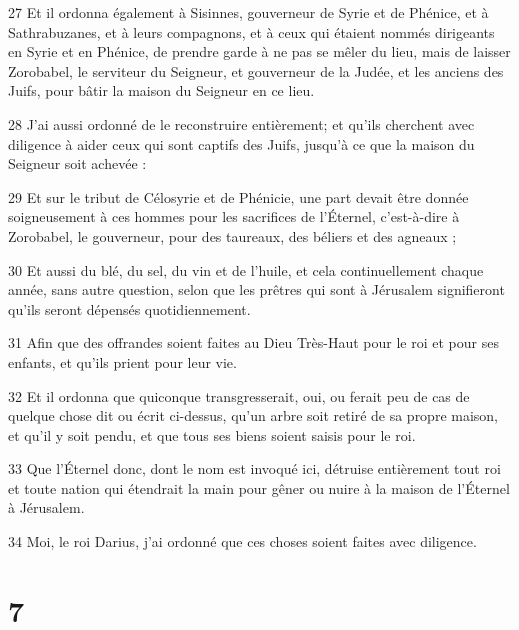 \par 27 Et il ordonna également à Sisinnes, gouverneur de Syrie et de Phénice, et à Sathrabuzanes, et à leurs compagnons, et à ceux qui étaient nommés dirigeants en Syrie et en Phénice, de prendre garde à ne pas se mêler du lieu, mais de laisser Zorobabel, le serviteur du Seigneur, et gouverneur de la Judée, et les anciens des Juifs, pour bâtir la maison du Seigneur en ce lieu.
\par 28 J'ai aussi ordonné de le reconstruire entièrement; et qu'ils cherchent avec diligence à aider ceux qui sont captifs des Juifs, jusqu'à ce que la maison du Seigneur soit achevée :
\par 29 Et sur le tribut de Célosyrie et de Phénicie, une part devait être donnée soigneusement à ces hommes pour les sacrifices de l'Éternel, c'est-à-dire à Zorobabel, le gouverneur, pour des taureaux, des béliers et des agneaux ;
\par 30 Et aussi du blé, du sel, du vin et de l'huile, et cela continuellement chaque année, sans autre question, selon que les prêtres qui sont à Jérusalem signifieront qu'ils seront dépensés quotidiennement.
\par 31 Afin que des offrandes soient faites au Dieu Très-Haut pour le roi et pour ses enfants, et qu'ils prient pour leur vie.
\par 32 Et il ordonna que quiconque transgresserait, oui, ou ferait peu de cas de quelque chose dit ou écrit ci-dessus, qu'un arbre soit retiré de sa propre maison, et qu'il y soit pendu, et que tous ses biens soient saisis pour le roi.
\par 33 Que l'Éternel donc, dont le nom est invoqué ici, détruise entièrement tout roi et toute nation qui étendrait la main pour gêner ou nuire à la maison de l'Éternel à Jérusalem.
\par 34 Moi, le roi Darius, j'ai ordonné que ces choses soient faites avec diligence.

\chapter{7}

